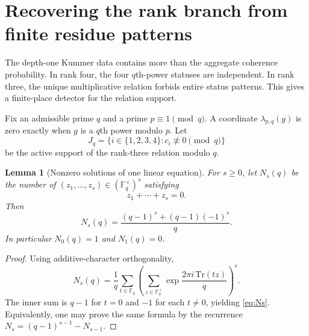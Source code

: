 \documentclass[11pt]{article}
\newtheorem{lemma}[theorem]{Lemma}
\theoremstyle{definition}
\theoremstyle{remark}
\newcommand{\F}{\mathbb{F}}
\begin{document}
\section{Recovering the rank branch from finite residue patterns}
\label{sec:detector}

The depth-one Kummer data contains more than the aggregate coherence probability.  In rank four,
the four $q$th-power statuses are independent.  In rank three, the unique multiplicative relation
forbids entire status patterns.  This gives a finite-place detector for the relation support.

Fix an admissible prime $q$ and a prime $p\equiv1\pmod q$.  A coordinate
$\lambda_{p,q}(g)$ is zero exactly when $g$ is a $q$th power modulo $p$.  Let
\[
       J_q=\{i\in\{1,2,3,4\}:c_i\not\equiv0\pmod q\}
\]
be the active support of the rank-three relation modulo $q$.

\begin{lemma}[Nonzero solutions of one linear equation]\label{lem:Ns}
For $s\ge0$, let $N_s(q)$ be the number of $(z_1,\dots,z_s)\in(\F_q^\times)^s$ satisfying
\[
       z_1+\cdots+z_s=0.
\]
Then
\[
       N_s(q)=\frac{(q-1)^s+(q-1)(-1)^s}{q}.
       \tag{5.1}\label{eq:Ns}
\]
In particular $N_0(q)=1$ and $N_1(q)=0$.
\end{lemma}
\begin{proof}
Using additive-character orthogonality,
\[
 N_s(q)=\frac1q\sum_{t\in\F_q}
       \left(\sum_{z\in\F_q^\times}\exp\frac{2\pi i\,\mathrm{Tr}(tz)}q\right)^s.
\]
The inner sum is $q-1$ for $t=0$ and $-1$ for each $t\ne0$, yielding
\eqref{eq:Ns}.  Equivalently, one may prove the same formula by the recurrence
$N_s=(q-1)^{s-1}-N_{s-1}$.
\end{proof}
\end{document}
